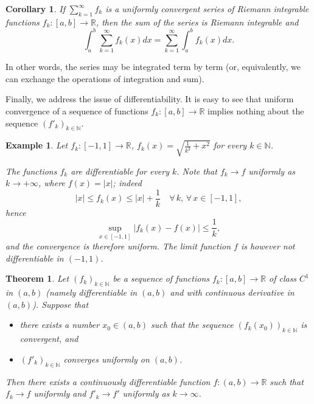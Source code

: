 \documentclass[a4paper,reqno]{amsart}
\numberwithin{equation}{section}
\newtheorem{theorem}[definition]{Theorem}
\newtheorem{corollary}[definition]{Corollary}
\newtheorem{example}{Example}
\def\N{\mathbb{N}}
\def\R{\mathbb{R}}
\begin{document}
\begin{corollary}\label{series:i}
If $\sum_{k=1}^\infty f_k$ is a uniformly convergent series of Riemann integrable functions $f_k : [a, b] \to \R$, then the sum of the series is Riemann integrable and
$$
\int_a^b\sum_{k=1}^\infty f_k(x) dx = \sum_{k=1}^\infty \int_a^b f_k(x) dx.
$$
\end{corollary}

In other words, the series may be integrated term by term (or, equivalently, we can exchange the operations of integration and sum).



\medskip

Finally, we address the issue of differentiability. It is easy to see that uniform convergence of a sequence of functions $f_k:[a,b] \to \R$ implies nothing about the sequence
$(f'_k)_{k\in \N}$.

\begin{example}
Let $f_k:[-1,1]\to \R$, $f_k(x) = \sqrt{\frac{1}{k^2}+x^2}$ for every $k\in \N$.

The functions $f_k$ are differentiable for every $k$. Note that $f_k\to f$ uniformly as $k\to +\infty$, where $f(x)=|x|$; indeed
$$
|x|\leq f_k(x) \leq |x|+\frac1k \quad \forall \,k, \, \forall\, x\in [-1,1],
$$
hence
$$
\sup_{x\in [-1,1]} |f_k(x)-f(x)| \leq \frac1k,
$$
and the convergence is therefore uniform. The limit function $f$ is however not differentiable in $(-1,1)$.

\end{example}



\begin{theorem}\label{uniform:differentiability}
Let $(f_k)_{k\in \N}$ be a sequence of functions $f_k:[a,b]\to \R$ of class $C^1$ in $(a,b)$ (namely differentiable in $(a,b)$ and with continuous derivative in $(a,b)$). Suppose that
\begin{itemize}
\item[(i)] there exists a number $x_0 \in (a, b)$ such that the sequence $(f_k(x_0))_{k\in \mathbb{N}}$ is convergent, and
\item[(ii)] $(f'_k)_{k\in \mathbb{N}}$ converges uniformly on $(a,b)$.
\end{itemize}
Then there exists a continuously differentiable function $f : (a, b) \to \R$ such that $f_k \to f$ uniformly and $f'_k \to f'$ uniformly as $k \to \infty$.
\end{theorem}
\end{document}
